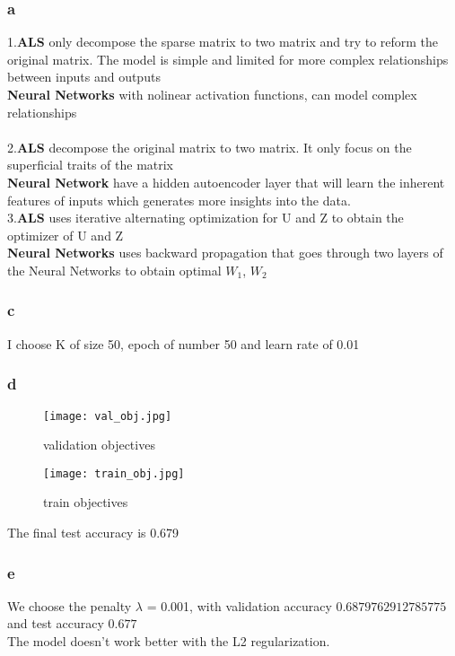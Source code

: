 \documentclass[12pt]{article}
\begin{document}
\subsubsection*{a}
1.\textbf{ALS} only decompose the sparse matrix to two matrix and try to reform the original matrix. The model is simple and limited for more complex relationships between inputs and outputs\\
\textbf{Neural Networks}  with nolinear activation functions, can model complex relationships\\
\\
2.\textbf{ALS} decompose the original matrix to two matrix. It only focus on the superficial traits of the matrix\\
\textbf{Neural Network} have a hidden autoencoder layer that will learn the inherent features of inputs which generates more insights into the data.
\\
3.\textbf{ALS} uses iterative alternating optimization for U and Z to obtain the optimizer of U and Z\\
\textbf{Neural Networks} uses backward propagation that goes through two layers of the Neural Networks to obtain optimal $W_1$, $W_2$
\subsubsection*{c}
I choose K of size 50, epoch of number 50 and learn rate of 0.01
\subsubsection*{d}
\begin{figure}[h]
    \begin{minipage}{0.5\textwidth}
    \centering
    \texttt{[image: val\_obj.jpg]}
    \caption{validation objectives}
    \label{fig:vobj}
    \end{minipage}%
    \begin{minipage}{0.5\textwidth}
    \centering
    \texttt{[image: train\_obj.jpg]}
    \caption{train objectives}
    \label{fig:tobj}
    \end{minipage}%
\end{figure}
The final test accuracy is 0.679
\subsubsection*{e}
We choose the penalty $\lambda$ = 0.001, with validation accuracy $0.6879762912785775$ and test accuracy $0.677$\\
The model doesn't work better with the L2 regularization.
\newpage
\end{document}

